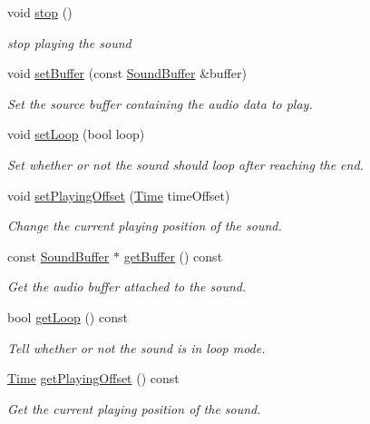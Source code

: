 \begin{DoxyCompactItemize}
void \hyperlink{classsf_1_1_sound_aa9c91c34f7c6d344d5ee9b997511f754}{stop} ()
\begin{DoxyCompactList}\small\item\em stop playing the sound \end{DoxyCompactList}\item 
void \hyperlink{classsf_1_1_sound_a8b395e9713d0efa48a18628c8ec1972e}{set\+Buffer} (const \hyperlink{classsf_1_1_sound_buffer}{Sound\+Buffer} \&buffer)
\begin{DoxyCompactList}\small\item\em Set the source buffer containing the audio data to play. \end{DoxyCompactList}\item 
void \hyperlink{classsf_1_1_sound_af23ab4f78f975bbabac031102321612b}{set\+Loop} (bool loop)
\begin{DoxyCompactList}\small\item\em Set whether or not the sound should loop after reaching the end. \end{DoxyCompactList}\item 
void \hyperlink{classsf_1_1_sound_ab905677846558042022dd6ab15cddff0}{set\+Playing\+Offset} (\hyperlink{classsf_1_1_time}{Time} time\+Offset)
\begin{DoxyCompactList}\small\item\em Change the current playing position of the sound. \end{DoxyCompactList}\item 
const \hyperlink{classsf_1_1_sound_buffer}{Sound\+Buffer} $\ast$ \hyperlink{classsf_1_1_sound_ab873727ae652c96b5a9437d7f8d8a44d}{get\+Buffer} () const
\begin{DoxyCompactList}\small\item\em Get the audio buffer attached to the sound. \end{DoxyCompactList}\item 
bool \hyperlink{classsf_1_1_sound_a054da07266ce8f39229495146e3041eb}{get\+Loop} () const
\begin{DoxyCompactList}\small\item\em Tell whether or not the sound is in loop mode. \end{DoxyCompactList}\item 
\hyperlink{classsf_1_1_time}{Time} \hyperlink{classsf_1_1_sound_a559bc3aea581107bcb380fdbe523aa08}{get\+Playing\+Offset} () const
\begin{DoxyCompactList}\small\item\em Get the current playing position of the sound. \end{DoxyCompactList}\item 

\end{DoxyCompactItemize}
